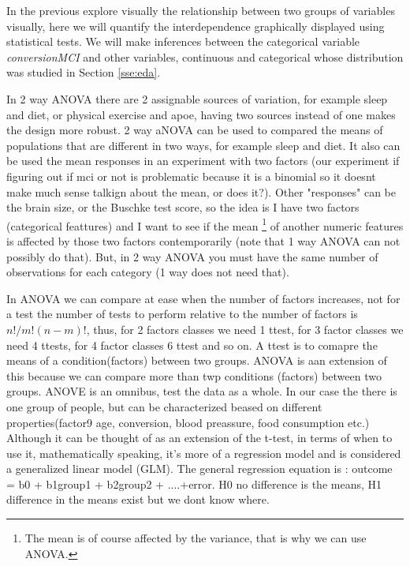 \documentclass[11pt]{article}
\theoremstyle{definition}
\theoremstyle{remark}
\begin{document}
In the previous explore visually the relationship between two groups of variables visually, here we will quantify the interdependence graphically displayed using statistical tests. We will make inferences between the categorical variable \emph{conversionMCI} and other variables, continuous and categorical whose distribution was studied in Section \ref{sse:eda}.

In 2 way ANOVA there are 2 assignable sources of variation, for example sleep and diet, or physical exercise and apoe, having two sources instead of one makes the design more robust. 2 way aNOVA can be used to compared the means of populations that are different in two ways, for example sleep and diet. It also can be used the mean responses in an experiment with two factors (our experiment if figuring out if mci or not is problematic because it is a binomial so it doesnt make much sense talkign about the mean, or does it?). Other "responses" can be the brain size, or the Buschke test score, so the idea is I have two factors (categorical feattures) and I want to see if the mean \footnote{ The mean is of course affected by the variance, that is why we can use ANOVA. } of another numeric features is affected by those two factors contemporarily (note that 1 way ANOVA can not possibly do that). But, in 2 way ANOVA you must have the same number of observations for each category (1 way does not need that). 


In ANOVA we can compare at ease when the number of factors increases, not for a test the number of tests to perform relative to the number of factors is $n!/m!(n-m)!$, thus, for 2 factors classes we need 1 ttest, for 3 factor classes we need 4 ttests, for 4 factor classes 6 ttest and so on.
A ttest is to comapre the means of a condition(factors) between two groups. ANOVA is aan extension of this because we can compare more than twp conditions (factors) between two groups. ANOVE is an omnibus, test the data as a whole.
In our case the there is one group of people, but can be characterized beased on different properties(factor9 age, conversion, blood preassure, food consumption etc.)
Although it can be thought of as an extension of the t-test, in terms of when to use it, mathematically speaking, it’s more of a regression model and is considered a generalized linear model (GLM). The general regression equation is : outcome = b0 + b1group1 + b2group2 + ....+error.
H0 no difference is the means, H1 difference in the means exist but we dont know where.
\end{document}
